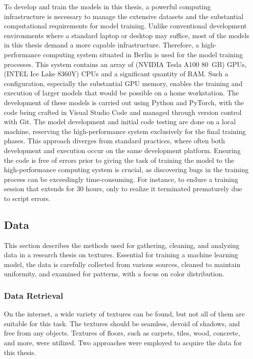 To develop and train the models in this thesis, a powerful computing infrastructure is necessary to manage the extensive datasets and the substantial computational requirements for model training. Unlike conventional development environments where a standard laptop or desktop may suffice, most of the models in this thesis demand a more capable infrastructure. Therefore, a high-performance computing system situated in Berlin is used for the model training processes. This system contains an array of (NVIDIA Tesla A100 80 GB) GPUs, (INTEL Ice Lake 8360Y) CPUs and a significant quantity of RAM. Such a configuration, especially the substantial GPU memory, enables the training and execution of larger models that would be possible on a home workstation. The development of these models is carried out using Python and PyTorch, with the code being crafted in Visual Studio Code and managed through version control with Git. The model development and initial code testing are done on a local machine, reserving the high-performance system exclusively for the final training phases. This approach diverges from standard practices, where often both development and execution occur on the same development platform. Ensuring the code is free of errors prior to giving the task of training the model to the high-performance computing system is crucial, as discovering bugs in the training process can be exceedingly time-consuming. For instance, to endure a training session that extends for 30 hours, only to realize it terminated prematurely due to script errors.

\subsection{Data}
    
This section describes the methods used for gathering, cleaning, and analyzing data in a research thesis on textures. Essential for training a machine learning model, the data is carefully collected from various sources, cleaned to maintain uniformity, and examined for patterns, with a focus on color distribution.


\subsubsection{Data Retrieval}
On the internet, a wide variety of textures can be found, but not all of them are suitable for this task. The textures should be seamless, devoid of shadows, and free from any objects. Textures of floors, such as carpets, tiles, wood, concrete, and more, were utilized. Two approaches were employed to acquire the data for this thesis.

